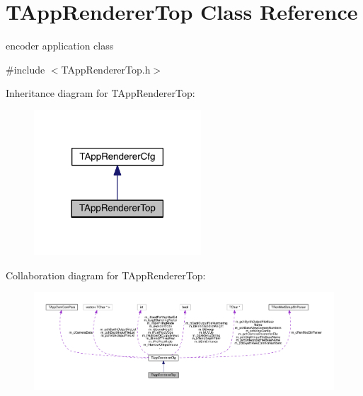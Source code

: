 \hypertarget{class_t_app_renderer_top}{}\section{T\+App\+Renderer\+Top Class Reference}
\label{class_t_app_renderer_top}


encoder application class  




{\ttfamily \#include $<$T\+App\+Renderer\+Top.\+h$>$}



Inheritance diagram for T\+App\+Renderer\+Top\+:
\nopagebreak
\begin{figure}[H]
\begin{center}
\leavevmode
\includegraphics[width=177pt]{d0/dbb/class_t_app_renderer_top__inherit__graph}
\end{center}
\end{figure}


Collaboration diagram for T\+App\+Renderer\+Top\+:
\nopagebreak
\begin{figure}[H]
\begin{center}
\leavevmode
\includegraphics[width=350pt]{d2/dee/class_t_app_renderer_top__coll__graph}
\end{center}
\end{figure}
